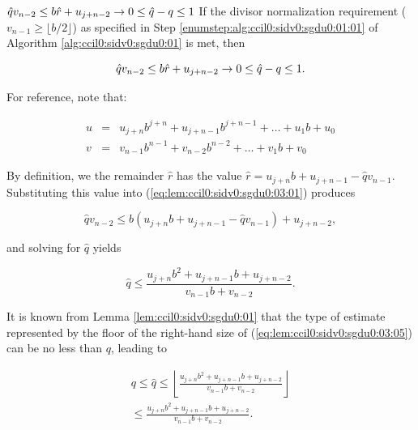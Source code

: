 \begin{vworklemmastatementpar}
{\mbox{\boldmath$\hat{q} v_{n-2} \leq b \hat{r} + u_{j+n-2} \to 0 \leq \hat{q} - q \leq 1$}}
\label{lem:ccil0:sidv0:sgdu0:03}
If the divisor normalization requirement ($v_{n-1} \geq \lfloor b/2 \rfloor$) as specified in
Step \ref{enumstep:alg:ccil0:sidv0:sgdu0:01:01} of
Algorithm \ref{alg:ccil0:sidv0:sgdu0:01} is met, then

\begin{equation}
\label{eq:lem:ccil0:sidv0:sgdu0:03:01}
\hat{q} v_{n-2} \leq b \hat{r} + u_{j+n-2} \to 0 \leq \hat{q} - q \leq 1 .
\end{equation}
\end{vworklemmastatementpar}
\begin{vworklemmaproof}
For reference, note that:

\begin{eqnarray}
\label{eq:lem:ccil0:sidv0:sgdu0:03:02}
u & = & u_{j+n} b^{j+n} + u_{j+n-1} b^{j+n-1} + \ldots{} + u_1 b + u_0 \\
\label{eq:lem:ccil0:sidv0:sgdu0:03:03}
v & = & v_{n-1} b^{n-1} + v_{n-2} b^{n-2} + \ldots{} + v_1 b + v_0
\end{eqnarray}

By definition, we the remainder
$\hat{r}$ has the value
$\hat{r} = u_{j+n} b + u_{j+n-1} - \hat{q} v_{n-1}$.  Substituting this value
into (\ref{eq:lem:ccil0:sidv0:sgdu0:03:01}) produces

\begin{equation}
\label{eq:lem:ccil0:sidv0:sgdu0:03:04}
\hat{q} v_{n-2} \leq b (u_{j+n} b + u_{j+n-1} - \hat{q} v_{n-1}) + u_{j+n-2} ,
\end{equation}

and solving for $\hat{q}$ yields

\begin{equation}
\label{eq:lem:ccil0:sidv0:sgdu0:03:05}
\hat{q} \leq  \frac{u_{j+n} b^2 + u_{j+n-1}b + u_{j+n-2}}{v_{n-1}b + v_{n-2}}.
\end{equation}

It is known from Lemma \ref{lem:ccil0:sidv0:sgdu0:01} that the type of estimate
represented by the floor of the right-hand size of (\ref{eq:lem:ccil0:sidv0:sgdu0:03:05})
can be no less than $q$, leading to

\begin{eqnarray}
\label{eq:lem:ccil0:sidv0:sgdu0:03:06}
& \displaystyle q  \leq  \hat{q}
\leq
\left\lfloor { \frac{u_{j+n} b^2 + u_{j+n-1}b + u_{j+n-2}}{v_{n-1}b + v_{n-2}} } \right\rfloor & \\
\nonumber & \displaystyle \leq  
\frac{u_{j+n} b^2 + u_{j+n-1}b + u_{j+n-2}}{v_{n-1}b + v_{n-2}}. &
\end{eqnarray}


\end{vworklemmaproof}
